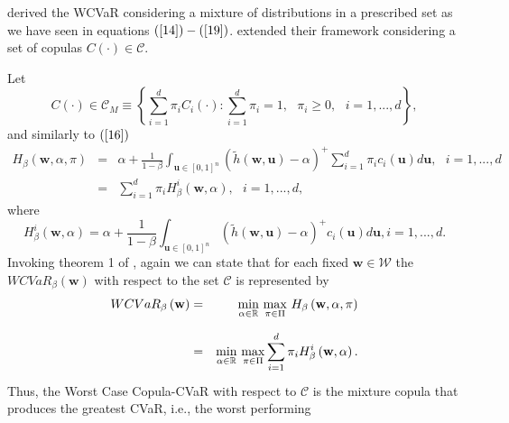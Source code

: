 \documentclass[a4paper,10pt]{article}
\begin{document}
\citet*{zhu2009worst} derived the WCVaR considering a mixture of
distributions in a prescribed set as we have seen in equations $\left( \ref%
{14}\right) -\left( \ref{19}\right) $. \citet*{kakouris14} extended their
framework considering a set of copulas $C\left( \cdot \right) \in \mathcal{C}
$.

Let
\begin{equation}
C\left( \cdot \right) \in \mathcal{C}_{M}\equiv \left\{ \sum_{i=1}^{d}\pi
_{i}C_{i}\left( \cdot \right) :\sum_{i=1}^{d}\pi _{i}=1,\text{ }\pi _{i}\geq
0,\text{ }i=1,...,d\right\} ,  \label{28}
\end{equation}%
and similarly to $\left( \ref{16}\right) $
\begin{eqnarray}
H_{\beta }\left( \mathbf{w},\alpha ,\pi \right) &=&\alpha +\frac{1}{1-\beta }%
\int_{\mathbf{u}\in \left[ 0,1\right] ^{n}}\left( \widetilde{h}\left( \mathbf{w,u}%
\right) -\alpha \right) ^{+}\sum_{i=1}^{d}\pi _{i}c_{i}\left( \mathbf{u}%
\right) d\mathbf{u},\text{ }i=1,...,d  \label{28b} \\
&=&\sum_{i=1}^{d}\pi _{i}H_{\beta }^{i}\left( \mathbf{w},\alpha \right) ,%
\text{ }i=1,...,d,  \label{29}
\end{eqnarray}%
where%
\begin{equation}
H_{\beta }^{i}\left( \mathbf{w},\alpha \right) =\alpha +\frac{1}{1-\beta }%
\int_{\mathbf{u}\in \left[ 0,1\right] ^{n}}\left( \widetilde{h}\left( \mathbf{w,u}%
\right) -\alpha \right) ^{+}c_{i}\left( \mathbf{u}\right) d\mathbf{u},\text{
}i=1,...,d.  \label{30}
\end{equation}%
Invoking theorem 1 of \citet*{zhu2009worst}, again we can state that for each
fixed $\mathbf{w}\in \mathcal{W}$ the $WCVaR_{\beta }\left( \mathbf{w}%
\right) $ with respect to the set $\mathcal{C}$ is represented by
\begin{eqnarray}
WCVaR_{\beta }\left( \mathbf{w}\right) &=&\underset{}{\underset{\alpha \in
		\mathbb{R}
	}{\min }~\underset{\pi \in \Pi }{\max }}~H_{\beta }\left( \mathbf{w},\alpha
,\pi \right)  \notag \\
&=&\underset{}{\underset{\alpha \in
		\mathbb{R}
	}{\min }~\underset{\pi \in \Pi }{\max }}\sum_{i=1}^{d}\pi _{i}H_{\beta
}^{i}\left( \mathbf{w},\alpha \right) .  \label{31}
\end{eqnarray}%
Thus, the Worst Case Copula-CVaR with respect to $\mathcal{C}$ is the
mixture copula that produces the greatest CVaR, i.e., the worst performing
\end{document}
